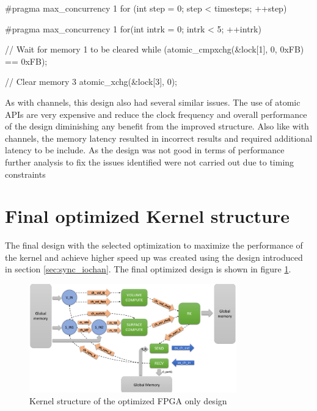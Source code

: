 \begin{CppCode}[caption=Synchronization Implementation with atomic functions, frame=tlrb, label=code:atomic_impl]
#pragma max_concurrency 1
for (int step = 0; step < timesteps; ++step)
{
    #pragma max_concurrency 1
    for(int intrk = 0; intrk < 5; ++intrk)
    {
        // Wait for memory 1 to be cleared
        while (atomic_cmpxchg(&lock[1], 0, 0xFB) == 0xFB);

        // Clear memory 3
        atomic_xchg(&lock[3], 0);
    }
}
\end{CppCode}

As with channels, this design also had several similar issues. The use of atomic APIs are very expensive and
reduce the clock frequency and overall performance of the design diminishing any benefit from the improved
structure. Also like with channels, the memory latency resulted in incorrect results and required additional
latency to be include. As the design was not good in terms of performance further analysis to fix the issues
identified were not carried out due to timing constraints

\section{Final optimized Kernel structure}
\label{sec:final_struc}

The final design with the selected optimization to maximize the performance of the kernel and achieve
higher speed up was created using the design introduced in section \ref{sec:sync_iochan}.
The final optimized design is shown in figure \ref{fig:fpgaonly_kernstruc}.

\begin{figure}[ht]%
    \centering
    \includegraphics[width=0.8\textwidth]{images/fpgaonly_kernstruc}
    \caption{Kernel structure of the optimized FPGA only design}
    \label{fig:fpgaonly_kernstruc}
\end{figure}

